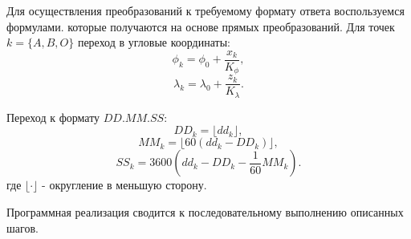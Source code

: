 Для осуществления преобразований к требуемому формату ответа воспользуемся формулами. которые получаются на 
основе прямых преобразований. Для точек \linebreak $k=\{A,B,O\}$ переход в угловые координаты:
$$\phi_k=\phi_0+\frac{x_k}{K_\phi},$$
$$\lambda_k=\lambda_0+\frac{z_k}{K_\lambda}.$$

Переход к формату $DD.MM.SS$:
$$DD_k=\lfloor dd_k \rfloor,$$
$$MM_k=\lfloor 60(dd_k-DD_k)\rfloor,$$
$$SS_k=3600(dd_k-DD_k-\frac{1}{60} MM_k ).$$
где $\lfloor  \cdot \rfloor$ - округление в меньшую сторону.

Программная реализация сводится к последовательному выполнению описанных шагов.

